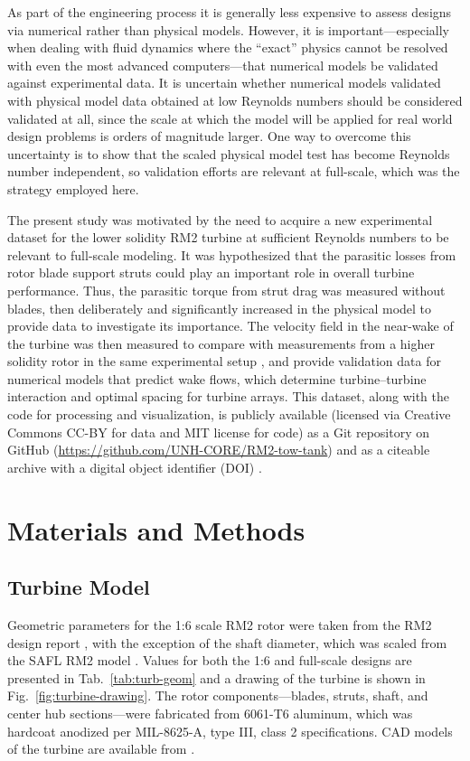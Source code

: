 \documentclass[10pt,letterpaper]{article}
\begin{document}
As part of the engineering process it is generally less expensive to assess
designs via numerical rather than physical models. However, it is
important---especially when dealing with fluid dynamics where the ``exact''
physics cannot be resolved with even the most advanced computers---that
numerical models be validated against experimental data. It is uncertain whether
numerical models validated with physical model data obtained at low Reynolds
numbers should be considered validated at all, since the scale at which the
model will be applied for real world design problems is orders of magnitude
larger. One way to overcome this uncertainty is to show that the scaled physical
model test has become Reynolds number independent, so validation efforts are
relevant at full-scale, which was the strategy employed here.

The present study was motivated by the need to acquire a new experimental
dataset for the lower solidity RM2 turbine at sufficient Reynolds numbers to be
relevant to full-scale modeling. It was hypothesized that the parasitic losses
from rotor blade support struts could play an important role in overall turbine
performance. Thus, the parasitic torque from strut drag was measured without
blades, then deliberately and significantly increased in the physical model to
provide data to investigate its importance. The velocity field in the near-wake
of the turbine was then measured to compare with measurements from a higher
solidity rotor in the same experimental setup \cite{Bachant2015-JoT}, and
provide validation data for numerical models that predict wake flows, which
determine turbine--turbine interaction and optimal spacing for turbine arrays.
This dataset, along with the code for processing and visualization, is publicly
available (licensed via Creative Commons CC-BY for data and MIT license for
code) as a Git repository on GitHub
(\url{https://github.com/UNH-CORE/RM2-tow-tank}) and as a citeable archive with
a digital object identifier (DOI) \cite{Bachant2015-RM2-data}.


\section*{Materials and Methods}

\subsection*{Turbine Model}

Geometric parameters for the 1:6 scale RM2 rotor were taken from the RM2 design
report \cite{Barone2011}, with the exception of the shaft diameter, which was
scaled from the SAFL RM2 model \cite{Hill2014}. Values for both the 1:6 and
full-scale designs are presented in Tab.~\ref{tab:turb-geom} and a drawing of
the turbine is shown in Fig.~\ref{fig:turbine-drawing}. The rotor
components---blades, struts, shaft, and center hub sections---were fabricated
from 6061-T6 aluminum, which was hardcoat anodized per MIL-8625-A, type III,
class 2 specifications. CAD models of the turbine are available from
\cite{Bachant2015-RM2-CAD}.
\end{document}
